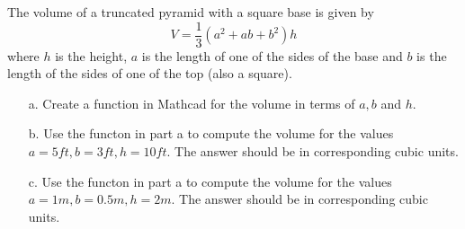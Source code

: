 {The volume of a truncated pyramid with a square base is given by 
\[
V=\frac{1}{3} (a^2 + ab +b^2)h
\] 
where $h$ is the height, $a$ is the length of one of the sides of the base and $b$ is the length of the sides of one of the top (also a square).  
\begin{enumerate}
\item[a.]Create a function in Mathcad for the volume in terms of $a,b$ and $h$.
\item[b.] Use the functon in part a to compute the volume for the values $a=5ft, b=3ft, h=10ft$. The answer should be in corresponding cubic units.
\item[c.] Use the functon in part a to compute the volume for the values $a=1m, b=0.5m, h=2m$. The answer should be in corresponding cubic units.
\end{enumerate}
}
{}